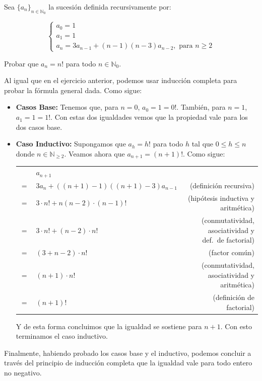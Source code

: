 \begin{problem}{}{}

    Sea ${\{ a_n \}}_{n \in \mathbb{N}_0}$ la sucesión definida recursivamente por:

    \[
    \begin{cases}
        a_0 = 1 \\
        a_1 = 1 \\
        a_n = 3 a_{n-1} + (n-1) (n-3) a_{n-2}, \text{ para } n \ge 2
    \end{cases}
    \]

    Probar que $a_n = n!$ para todo $n \in \mathbb{N}_0$.

\end{problem}
\vspace{1ex}

Al igual que en el ejercicio anterior, podemos usar inducción completa para probar la fórmula general dada.
Como sigue:

\begin{itemize}
    \item \textbf{Casos Base:} Tenemos que, para $n=0$, $a_0 = 1 = 0!$. También, para $n=1$, $a_1 = 1 = 1!$.
          Con estas dos igualdades vemos que la propiedad vale para los dos casos base.

    \item \textbf{Caso Inductivo:} Supongamos que $a_h = h!$ para todo $h$ tal que $0 \le h \le n$ donde $n \in \mathbb{N}_{\ge 2}$.
          Veamos ahora que $a_{n+1} = (n+1)!$.
          Como sigue:

          \begin{tabular}{|l l r}
             & $a_{n+1}$ & \\
            $=$ & $3 a_n + ((n+1)-1)((n+1)-3) a_{n-1}$ & (definición recursiva) \\
            $=$ & $3 \cdot n! + n(n-2) \cdot (n-1)!$ & (hipótesis inductiva y aritmética) \\
            $=$ & $3 \cdot n! + (n-2) \cdot n!$ & (conmutatividad, asociatividad y def.\ de factorial) \\
            $=$ & $(3 + n - 2) \cdot n!$ & (factor común) \\
            $=$ & $(n + 1) \cdot n!$ & (conmutatividad, asociatividad y aritmética) \\
            $=$ & $(n+1)!$ & (definición de factorial)
          \end{tabular}

          Y de esta forma concluimos que la igualdad se sostiene para $n+1$.
          Con esto terminamos el caso inductivo.
\end{itemize}

Finalmente, habiendo probado los casos base y el inductivo, podemos concluir a través del principio de inducción completa que la igualdad vale para todo entero no negativo.
